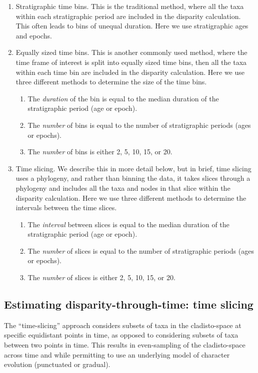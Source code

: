 \documentclass[12pt,a4paper]{article}
\begin{document}
\begin{enumerate}
  \item Stratigraphic time bins. This is the traditional method, where all the taxa within each stratigraphic period are included in the disparity calculation. This often leads to bins of unequal duration. Here we use stratigraphic ages and epochs.
  \item Equally sized time bins. This is another commonly used method, where the time frame of interest is split into equally sized time bins, then all the taxa within each time bin are included in the disparity calculation. Here we use three different methods to determine the size of the time bins. 
    \begin{enumerate}
      \item The \textit{duration} of the bin is equal to the median duration of the stratigraphic period (age or epoch).
      \item The \textit{number} of bins is equal to the number of stratigraphic periods (ages or epochs).
      \item The \textit{number} of bins is either 2, 5, 10, 15, or 20.
    \end{enumerate}
  \item Time slicing. We describe this in more detail below, but in brief, time slicing uses a phylogeny, and rather than binning the data, it takes slices through a phylogeny and includes all the taxa and nodes in that slice within the disparity calculation. Here we use three different methods to determine the intervals between the time slices.
    \begin{enumerate}
      \item The \textit{interval} between slices is equal to the median duration of the stratigraphic period (age or epoch).
      \item The \textit{number} of slices is equal to the number of stratigraphic periods (ages or epochs).
      \item The \textit{number} of slices is either 2, 5, 10, 15, or 20.
    \end{enumerate}  

\end{enumerate}

\subsection{Estimating disparity-through-time: time slicing} 
\label{time_slicing}
The ``time-slicing'' approach considers subsets of taxa in the cladisto-space at specific equidistant points in time, as opposed to considering subsets of taxa between two points in time.
This results in even-sampling of the cladisto-space across time and while permitting to use an underlying model of character evolution (punctuated or gradual). %
\end{document}
